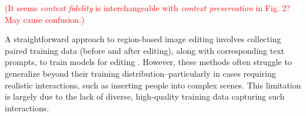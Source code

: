 \documentclass{article}
\newenvironment{cyanpar}{\color{cyan}}{}
\newcommand{\kc}[1]{\textcolor{blue}{#1}}
\begin{document}
\textcolor{red}{(It seems \textit{context fidelity} is interchangeable with \textit{context preservation} in Fig. 2? May cause confusion.)}




\begin{cyanpar}

A straightforward approach to region-based image editing involves collecting paired training data (before and after editing), along with corresponding text prompts, to train models for editing \citep{brooks2023instructpix2pix, zhang2023magicbrush, wasserman2024paint, li2024brushedit, hui2024hq, wei2024omniedit}. However, these methods often struggle to generalize beyond their training distribution--particularly in cases requiring realistic interactions, such as inserting people into complex scenes. This limitation is largely due to the lack of diverse, high-quality training data capturing such interactions.

\end{cyanpar}
\end{document}
